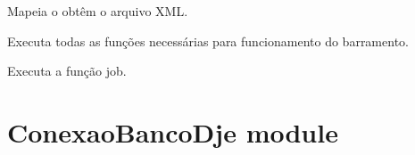 \documentclass[letterpaper,10pt,english]{sphinxmanual}
\begin{document}
\begin{fulllineitems}
\begin{fulllineitems}
\end{fulllineitems}


\begin{fulllineitems}
\label{\detokenize{ClasseGeral:ClasseGeral.Geral.metadatas}}
\end{fulllineitems}


\begin{fulllineitems}
\label{\detokenize{ClasseGeral:ClasseGeral.Geral.recuperaXML}}
Mapeia o obtêm o arquivo XML.

\end{fulllineitems}


\begin{fulllineitems}
\label{\detokenize{ClasseGeral:ClasseGeral.Geral.runAll}}
Executa todas as funções necessárias para funcionamento do barramento.

\end{fulllineitems}


\begin{fulllineitems}
\label{\detokenize{ClasseGeral:ClasseGeral.Geral.steve}}
Executa a função job.

\end{fulllineitems}


\end{fulllineitems}



\section{ConexaoBancoDje module}
\label{\detokenize{ConexaoBancoDje:module-ConexaoBancoDje}}\label{\detokenize{ConexaoBancoDje:conexaobancodje-module}}\label{\detokenize{ConexaoBancoDje::doc}}
\end{document}
